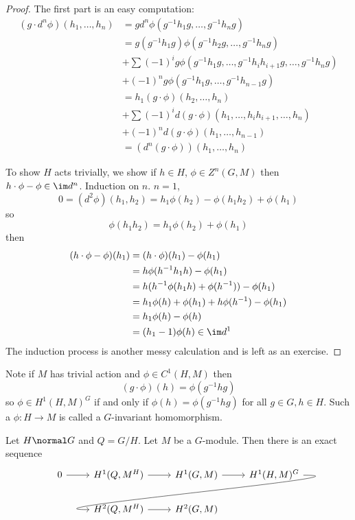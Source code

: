 \documentclass[a4paper]{article}
\begin{document}
\begin{proof}
  The first part is an easy computation:
  \begin{align*}
    (g \cdot d^n \phi)(h_1, \dots, h_n)
    &= g d^n\phi(g^{-1}h_1g, \dots, g^{-1}h_ng) \\
    &= g(g^{-1}h_1g) \phi(g^{-1}h_2g, \dots, g^{-1}h_ng) \\
    &+ \sum (-1)^i g \phi(g^{-1}h_1g, \dots, g^{-1} h_ih_{i + 1} g, \dots, g^{-1} h_n g) \\
    &+ (-1)^n g \phi(g^{-1}h_1g, \dots, g^{-1}h_{n - 1}g) \\
    &= h_1 (g \cdot \phi)(h_2, \dots, h_n) \\
    &+ \sum (-1)^i d (g \cdot \phi) (h_1, \dots, h_i h_{i + 1}, \dots, h_n) \\
    &+ (-1)^n d(g \cdot \phi) (h_1, \dots, h_{n - 1}) \\
    &= (d^n(g \cdot \phi))(h_1, \dots, h_n)
  \end{align*}
  
  To show \(H\) acts trivially, we show if \(h \in H\), \(\phi \in Z^n(G, M)\) then \(h \cdot \phi - \phi \in \im d^n\). Induction on \(n\). \(n = 1\),
  \[
    0 = (d^2 \phi)(h_1, h_2) = h_1\phi(h_2) - \phi(h_1h_2) + \phi(h_1)
  \]
  so
  \[
    \phi(h_1h_2) = h_1\phi(h_2) + \phi(h_1)
  \]
  then
  \begin{align*}
    (h \cdot \phi - \phi)(h_1)
    &= (h \cdot \phi)(h_1) - \phi(h_1) \\
    &= h \phi(h^{-1}h_1h) - \phi(h_1) \\
    &= h(h^{-1} \phi(h_1h) + \phi(h^{-1})) - \phi(h_1) \\
    &= h_1\phi(h) + \phi(h_1) + h\phi(h^{-1}) - \phi(h_1) \\
    &= h_1\phi(h) - \phi(h) \\
    &= (h_1 - 1) \phi(h) \in \im d^1
  \end{align*}
  The induction process is another messy calculation and is left as an exercise.
\end{proof}

Note if \(M\) has trivial action and \(\phi \in C^1(H, M)\) then
\[
  (g \cdot \phi)(h) = \phi(g^{-1}hg)
\]
so \(\phi \in H^1(H, M)^G\) if and only if \(\phi(h) = \phi(g^{-1}hg)\) for all \(g \in G, h \in H\). Such a \(\phi: H \to M\) is called a \(G\)-invariant homomorphism.

\begin{theorem}
  Let \(H \normal G\) and \(Q = G/H\). Let \(M\) be a \(G\)-module. Then there is an exact sequence
  \[
    \begin{tikzcd}
      0 \ar[r] & H^1(Q, M^H) \ar[r] & H^1(G, M) \ar[r] & H^1(H, M)^G \ar[dll, out=0, in=180, overlay] \\
      & H^2(Q, M^H) \ar[r] & H^2(G, M)
    \end{tikzcd}
  \]
\end{theorem}
\end{document}
